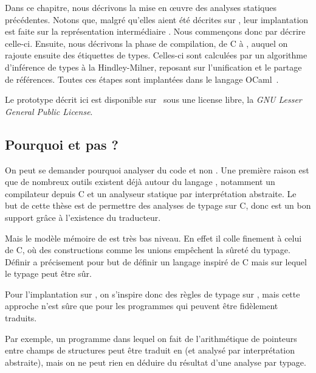 Dans ce chapitre, nous décrivons la mise en œuvre des analyses statiques
précédentes. Notons que, malgré qu'elles aient été décrites sur \langname, leur
implantation est faite sur la représentation intermédiaire \newspeak. Nous
commençons donc par décrire celle-ci. Ensuite, nous décrivons la phase de
compilation, de C à \newspeak, auquel on rajoute ensuite des étiquettes de
types. Celles-ci sont calculées par un algorithme d'inférence de types à la
Hindley-Milner, reposant sur l'unification et le partage de références. Toutes
ces étapes sont implantées dans le langage OCaml~\cite{DAOC}.


Le prototype décrit ici est disponible sur~ sous une license
libre, la \emph{GNU Lesser General Public License}.


\subsection*{Pourquoi \newspeak et pas \langname?}


On peut se demander pourquoi analyser du code \newspeak et non \langname. Une
première raison est que de nombreux outils existent déjà autour du langage
\newspeak, notamment un compilateur depuis C et un analyseur statique par
interprétation abstraite. Le but de cette thèse est de permettre des analyses de
typage sur C, donc \newspeak est un bon support grâce à l'existence du
traducteur.


Mais le modèle mémoire de \newspeak est très bas niveau. En effet il colle
finement à celui de C, où des constructions comme les unions empêchent la sûreté
du typage. Définir \langname a précisement pour but de définir un langage
inspiré de C mais sur lequel le typage peut être sûr.

Pour l'implantation sur \newspeak, on s'inspire donc des règles de typage sur
\langname, mais cette approche n'est sûre que pour les programmes qui peuvent
être fidèlement traduits.


Par exemple, un programme dans lequel on fait de l'arithmétique de pointeurs
entre champs de structures peut être traduit en \newspeak (et analysé par
interprétation abstraite), mais on ne peut rien en déduire du résultat d'une
analyse par typage.

